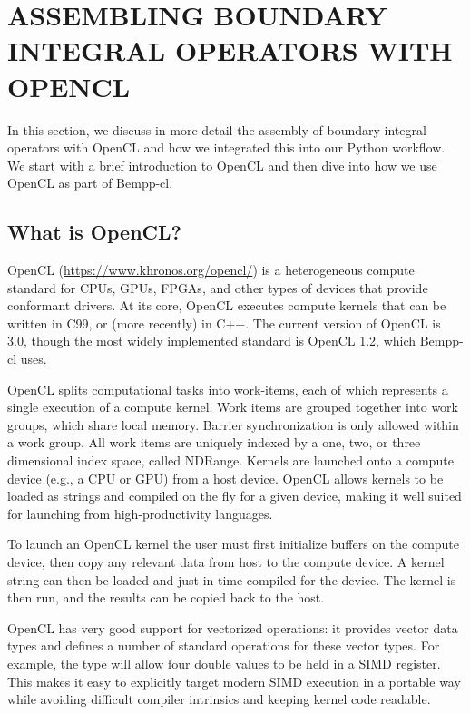 \section{ASSEMBLING BOUNDARY INTEGRAL OPERATORS WITH OPENCL}

In this section, we discuss in more detail the assembly of boundary integral operators with OpenCL
and how we integrated this into our Python workflow. We start with a brief introduction to OpenCL and then
dive into how we use OpenCL as part of Bempp-cl.

\subsection{What is OpenCL?}

OpenCL (\url{https://www.khronos.org/opencl/}) is a heterogeneous compute standard for CPUs, GPUs, FPGAs, and other types of devices that provide conformant drivers. At its core, OpenCL executes compute kernels that can be written in C99, or (more recently) in C++. The current version of OpenCL is 3.0, though the most widely implemented standard is OpenCL 1.2, which Bempp-cl uses.

OpenCL splits computational tasks into work-items, each of which represents a single execution of a compute kernel. Work items are grouped together into work groups, which share local memory. Barrier synchronization is only allowed within a work group. All work items are uniquely indexed by a one, two, or three dimensional index space, called NDRange. Kernels are launched onto a compute device (e.g., a CPU or GPU) from a host device. OpenCL allows kernels to be loaded as strings and compiled on the fly for a given device, making it well suited for launching from high-productivity languages.

To launch an OpenCL kernel the user must first initialize buffers on the compute device, then copy any relevant data from host to the compute device. A kernel string can then be loaded and just-in-time compiled for the device. The kernel is then run, and the results can be copied back to the host.

OpenCL has very good support for vectorized operations: it provides vector data types and defines a number of standard operations for these vector types. For example, the type  will allow four double values to be held in a SIMD register. This makes it easy to explicitly target modern SIMD execution in a portable way while avoiding difficult compiler intrinsics and keeping kernel code readable.


